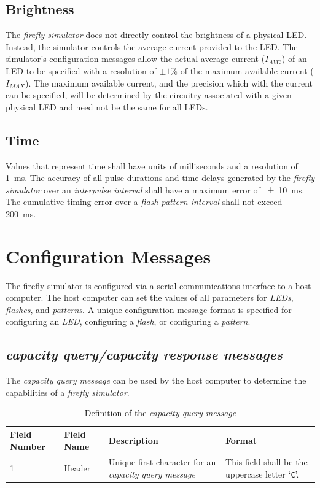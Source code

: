 \documentclass[letterpaper,11pt]{article}
\begin{document}
\subsection{Brightness}

The \textit{firefly simulator} does not directly control the brightness of a
physical LED. Instead, the simulator controls the average current provided to
the LED. The simulator's configuration messages allow the actual average
current ($I_{AVG}$) of an LED to be specified with a resolution of $\pm 1$\% of
the maximum available current ($I_{MAX}$). The maximum available current, and
the precision which with the current can be specified, will be
determined by the circuitry associated with a given physical LED and need not be
the same for all LEDs.

\subsection{Time}

Values that represent time shall have units of milliseconds and a resolution
of \SI{1}{\milli\second}. The accuracy of all pulse durations and time delays
generated by the \textit{firefly simulator} over an \textit{interpulse interval}
shall have a maximum error of \SI{\pm 10}{\milli\second}. The cumulative timing
error over a \textit{flash pattern interval} shall not exceed
\SI{200}{\milli\second}.

\section{Configuration Messages}

The firefly simulator is configured via a serial communications interface to
a host computer. The host computer can set the values of all parameters for
\textit{LEDs}, \textit{flashes}, and \textit{patterns}. A unique configuration
message format is specified for configuring an \textit{LED}, configuring a
\textit{flash}, or configuring a \textit{pattern}.

\subsection{\textit{capacity query/capacity response messages}}

The \textit{capacity query message} can be used by the host computer to
determine the capabilities of a \textit{firefly simulator}.

\begin{table}[H]
  \caption{Definition of the \textit{capacity query message}}
  \centering
  \setlength\extrarowheight{2pt}
  \begin{tabular}[h]{|p{0.5in}|p{1.00in}|p{2.25in}|p{2.25in}|} \hline
    Field Number & Field Name & Description & Format \\ \hline
    1            & Header
    & Unique first character for an \textit{capacity query message}
    & This field shall be the uppercase letter `\texttt{C}'.
    \\ \hline
  \end{tabular}
  \label{tab:CapacityQuery}
\end{table}
\end{document}
